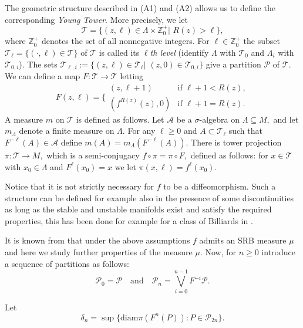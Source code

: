 \documentclass[a4paper,12pt]{amsart}
\numberwithin{equation}{section}
\begin{document}
The geometric structure described in (A1) and (A2) allows us to
define the corresponding \emph{Young Tower}. More precisely, we let
\begin{equation}\label{tower1}
 \mathcal{T}=\{(z,\ell)\in\Lambda\times\mathbb{Z}^+_0|\,\, R(z)>\ell\},
 \end{equation}
where $\mathbb{Z}_0^+$ denotes the set of all nonnegative integers.
For $\ell\in{\mathbb Z}_0^+$ the subset $\mathcal
T_\ell=\{(\cdot,\ell)\in\mathcal T\}$ of $\mathcal T$ is called its
{\it$\ell$th level} (identify $\Lambda$ with $\mathcal T_0$ and
$\Lambda_i$ with $\mathcal T_{0, i}$). The sets $\mathcal
T_{\ell,i}:=\{(z,\ell)\in\mathcal T_\ell|\,\,(z, 0)\in\mathcal
T_{0,i}\}$  give a partition $\mathcal P$ of $\mathcal T.$ We can
define a map \( F: \mathcal T \to \mathcal T \) letting
\begin{equation}\label{towerm}
F(z,\ell)=\Big\{\begin{array}{cc}
(z,\ell+1) &\text{if} \,\, \ell+1<R(z),\\
(f^{R(z)}(z), 0)&  \text{if}\,\, \ell+1=R(z).
\end{array}
\end{equation}
A measure  \(  m  \) on \(  \mathcal T\) is defined as
follows. Let $\mathcal{A}$ be a $\sigma$-algebra on $\Lambda
\subseteq M,$ and let $m_\Lambda$ denote a finite measure on  $\Lambda.$  For  any $\ell\geq 0$ and $A\subset\mathcal
T_\ell$ such that
 $F^{-\ell}(A)\in\mathcal{A}$ define
$m(A)=m_\Lambda(F^{-\ell}(A)).$ There is  tower projection
$\pi:\mathcal T\to M,$ which is a semi-conjugacy $f\circ\pi=\pi\circ
F,$ defined as follows: for $x\in\mathcal T$ with $x_0\in\Lambda$
and $F^\ell(x_0)=x$ we let $\pi(x, \ell)=f^\ell(x_0).$

Notice that it is not strictly necessary for \(  f  \) to be a
diffeomorphism. Such a structure can be defined for example also in
the presence of some discontinuities as long as the stable and
unstable manifolds exist and satisfy the required properties, this
has been done for example for a class of Billiards in \cite{Chern}.

It is known from \cite{Y1} that under the above assumptions $f$
admits an SRB measure $\mu$ and here we study further properties of
the measure $\mu.$ Now, for $n\ge 0$ introduce a sequence of
partitions as follows:
$$\mathcal P_0=\mathcal P\quad \text{and} \quad \mathcal
P_n=\bigvee_{i=0}^{n-1}F^{-i}\mathcal P.$$

Let
$$\delta_n=\sup\{\text{diam}\pi(F^n(P)):P\in \mathcal P_{2n}\}.$$
\end{document}
